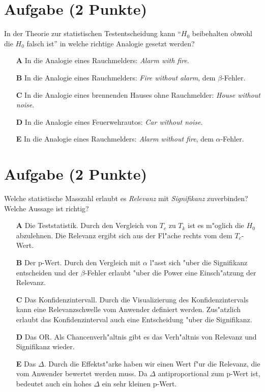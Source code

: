 \documentclass[a4paper, 9pt]{scrartcl}\usepackage[]{graphicx}\usepackage[]{xcolor}
\begin{document}

\section{Aufgabe \hfill (2 Punkte)}



In der Theorie zur statistischen Testentscheidung kann "`$H_0$ beibehalten obwohl die $H_0$ falsch ist"'
in welche richtige Analogie gesetzt werden?



\begin{enumerate}
\item [\textbf{A} \msquare] In die Analogie eines Rauchmelders: \textit{Alarm with fire}.
\item [\textbf{B} \msquare] In die Analogie eines Rauchmelders: \textit{Fire without alarm}, dem $\beta$-Fehler.
\item [\textbf{C} \msquare] In die Analogie eines brennenden Hauses ohne Rauchmelder: \textit{House without noise}.
\item [\textbf{D} \msquare] In die Analogie eines Feuerwehrautos: \textit{Car without noise}.
\item [\textbf{E} \msquare] In die Analogie eines Rauchmelders: \textit{Alarm without fire}, dem $\alpha$-Fehler.
\end{enumerate}

\section{Aufgabe \hfill (2 Punkte)}

Welche statistische Masszahl erlaubt es \textit{Relevanz} mit
\textit{Signifikanz} zuverbinden? Welche Aussage ist richtig?



\begin{enumerate}
\item [\textbf{A} \msquare] Die Teststatistik. Durch den Vergleich von $T_c$ zu $T_k$ ist es m{"o}glich die $H_0$ abzulehnen. Die Relevanz ergibt sich aus der Fl{"a}che rechts vom dem $T_c$-Wert.
\item [\textbf{B} \msquare] Der p-Wert. Durch den Vergleich mit $\alpha$ l{"a}sst sich {"u}ber die Signifikanz entscheiden und der $\beta$-Fehler erlaubt {"u}ber die Power eine Einsch{"a}tzung der Relevanz.
\item [\textbf{C} \msquare] Das Konfidenzintervall. Durch die Visualizierung des Konfidenzintervals kann eine Relevanzschwelle vom Anwender definiert werden. Zus{"a}tzlich erlaubt das Konfidenzinterval auch eine Entscheidung {"u}ber die Signifikanz.
\item [\textbf{D} \msquare] Das OR. Als Chancenverh{"a}ltnis gibt es das Verh{"a}ltnis von Relevanz und Signifikanz wieder.
\item [\textbf{E} \msquare] Das $\Delta$. Durch die Effektst{"a}rke haben wir einen Wert f{"u}r die Relevanz, die vom Anwender bewertet werden muss. Da $\Delta$ antiproportional zum p-Wert ist, bedeutet auch ein hohes $\Delta$ ein sehr kleinen p-Wert.
\end{enumerate}
\end{document}
